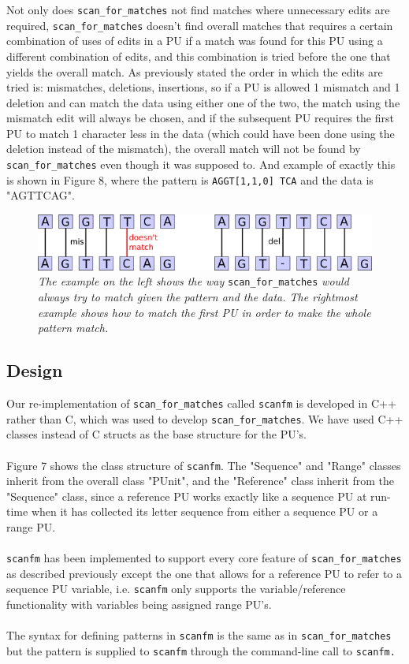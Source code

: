 \documentclass[12pt]{article}
\newcommand{\scm}{\texttt{scan\_for\_matches} }
\newcommand{\sfm}{\texttt{scanfm} }
\newcommand{\sfmp}{\texttt{scanfm.}}
\newcommand{\pu}{PU }
\newcommand{\pusp}{PU's. }
\newcommand{\pup}{PU. }
\begin{document}
\noindent Not only does \scm not find matches where unnecessary edits are required, \scm doesn't  
find overall matches that requires a certain combination of uses of edits in a \pu if a match was found for this
\pu using a different combination of edits, and this combination is tried before the one that yields the overall match.
As previously stated the order in which the edits are tried is: mismatches, deletions, insertions, so if
a \pu is allowed 1 mismatch and 1 deletion and can match the data using either one of the two, the match using the
mismatch edit will always be chosen, and if the subsequent \pu requires the first \pu to match 1 character less
in the data (which could have been done using the deletion instead of the mismatch), 
the overall match will not be found by \scm even though it was supposed to. And example of exactly this is shown in
Figure 8, where the pattern is \texttt{AGGT[1,1,0] TCA} and the data is "AGTTCAG".
\begin{figure}
\begin{center}
\includegraphics[scale=0.8]{Diagrams/fail2.png}
\end{center}
\caption{\textit{The example on the left shows the way} \scm \textit{would always try to match given the pattern and the data.
The rightmost example shows how to match the first \pu in order to make the whole pattern match.}}
\end{figure}
\subsection{Design}
Our re-implementation of \scm called \sfm is developed in C++ rather than C, which was used to develop 
\texttt{scan\_for\_matches}. We have used C++ classes instead of C structs as the base structure for the PU's. \\ \\ 
Figure 7 shows the class structure of \texttt{scanfm}. The "Sequence" and "Range" classes inherit from the overall
class "PUnit", and the "Reference" class inherit from the "Sequence" class, since a reference \pu works exactly like a 
sequence \pu at run-time when it has collected its letter sequence from either a sequence \pu or a range \pup \\ \\
\sfm has been implemented to support every core feature of \scm as described previously except the one
that allows for a reference \pu to refer to a sequence \pu variable, i.e. \sfm only supports the variable/reference
functionality with variables being assigned range \pusp \\ \\
The syntax for defining patterns in \sfm is the same as in \scm but the pattern is supplied to \sfm through 
the command-line call to \sfmp
\end{document}
